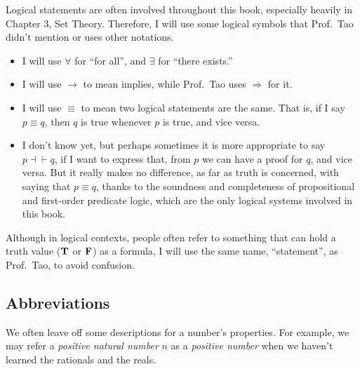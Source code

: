 Logical statements are often involved throughout this book, especially heavily in Chapter 3, Set Theory. Therefore, I will use some logical symbols that Prof.~Tao didn't mention or uses other notations.
\begin{itemize}
	\item I will use $\forall$ for ``for all'', and $\exists$ for ``there exists.''
	\item I will use $\to$ to mean implies, while Prof.~Tao uses $\Rightarrow$ for it.
	\item I will use $\equiv$ to mean two logical statements are the same. That is, if I say $p \equiv q$, then $q$ is true whenever $p$ is true, and vice versa.
	\item I don't know yet, but perhaps sometimes it is more appropriate to say $p \dashv\vdash q$, if I want to express that, from $p$ we can have a proof for $q$, and vice versa. But it really makes no difference, as far as truth is concerned, with saying that $p \equiv q$, thanks to the soundness and completeness of propositional and first-order predicate logic, which are the only logical systems involved in this book.
\end{itemize}

Although in logical contexts, people often refer to something that can hold a truth value ($\mathbf{T}$ or $\mathbf{F}$) as a formula, I will use the same name, ``statement'', as Prof.~Tao, to avoid confusion.

\subsection*{Abbreviations}
We often leave off some descriptions for a number's properties. For example, we may refer a 
\emph{positive natural number} $n$ as a \emph{positive number} when we haven't learned the rationals and 
the reals.